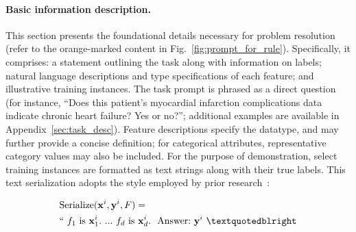 \vspace*{-0.12in}
\paragraph{Basic information description.} This section presents the foundational details necessary for problem resolution (refer to the orange-marked content in Fig.~\ref{fig:prompt_for_rule}). Specifically, it comprises: a statement outlining the task along with information on labels; natural language descriptions and type specifications of each feature; and illustrative training instances. The task prompt is phrased as a direct question (for instance, ``Does this patient's myocardial infarction complications data indicate chronic heart failure? Yes or no?''; additional examples are available in Appendix~\ref{sec:task_desc}). Feature descriptions specify the datatype, and may further provide a concise definition; for categorical attributes, representative category values may also be included. For the purpose of demonstration, select training instances are formatted as text strings along with their true labels. This text serialization adopts the style employed by prior research~\cite{dinh2022lift,hegselmann2023tabllm}:

\begin{align}
&\text{Serialize}(\mathbf{x}^i,\mathbf{y}^i, F) = \nonumber \\ 
&``\ f_1\ \text{is}\ \mathbf{x}^i_1.\ ... \ f_d\  \text{is}\  \mathbf{x}^i_d.\ \ \text{Answer:}\  \mathbf{y}^i\ ”
\end{align}

\vspace*{-0.12in}
